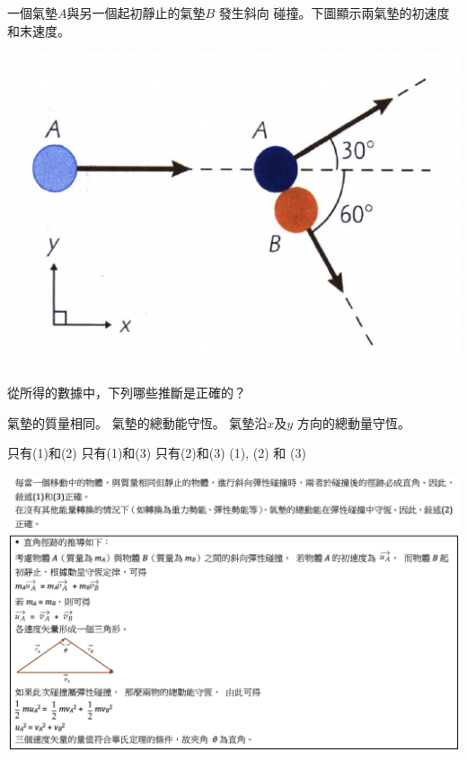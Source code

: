 {
    一個氣墊$A$與另一個起初靜止的氣墊$B$ 發生斜向 碰撞。下圖顯示兩氣墊的初速度和末速度。\bigskip
    \par{\par\centering\includegraphics[width=.35\textwidth]{./img/ch5_momentum_mc_2024-05-11-22-01-38.png}\par}\bigskip
    從所得的數據中，下列哪些推斷是正確的？
    \begin{statements}
        \task 氣墊的質量相同。
        \task 氣墊的總動能守恆。
        \task 氣墊沿$x$及$y$ 方向的總動量守恆。
    \end{statements}
    \begin{tasks}
        \task 只有(1)和(2)
        \task 只有(1)和(3)
        \task 只有(2)和(3)
        \task (1), (2) 和 (3)
    \end{tasks}

}{
    \par{\par\centering\includegraphics[width=\textwidth]{./img/ch5_momentum_mc_2024-05-11-22-49-02.png}\par}
}

